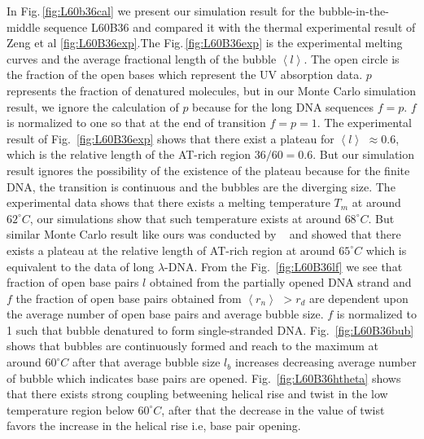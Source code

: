 \documentclass[12pt,masters,final]{UTRGVthesis}
\begin{document}
In Fig.\,\ref{fig:L60b36cal} we present our simulation result for the bubble-in-the-middle sequence L60B36 and compared it with the thermal experimental result of Zeng et al \cite{zeng2003length,zeng2004bubble}\ref{fig:L60B36exp}.The Fig.\,\ref{fig:L60B36exp} is the experimental melting curves and the average fractional length of the bubble $\left< l \right> $. The open circle is the fraction of the open bases which represent the UV absorption data. $p$ represents the fraction of denatured molecules, but in our Monte Carlo simulation result, we ignore the calculation of $p$ because for the long DNA sequences $f=p$. $f$ is normalized to one so that at the end of transition $f=p=1$. The experimental result of Fig.~\ref{fig:L60B36exp} shows that there exist a plateau for $\left< l \right> $ $\approx 0.6$, which is the relative length of the AT-rich region $36/60=0.6$. But our simulation result ignores the possibility of the existence of the plateau because for the finite DNA, the transition is continuous and the bubbles are the diverging size. The experimental data shows that there exists a melting temperature $T_{m}$ at around $62^\circ C$, our simulations show that such temperature exists at around $68^\circ C$. But similar Monte Carlo result like ours was conducted by ~\cite{ares2005bubble} and showed that there exists a plateau at the relative length of AT-rich region at around $65^\circ C$  which is equivalent to the data of long $\lambda$-DNA. From the Fig.~\ref{fig:L60B36lf} we see that fraction of open base pairs $l$ obtained from the partially opened DNA strand and $f$  the fraction of open base pairs obtained from $\left< r_{n} \right> $ $> r_{d}$ are dependent upon the average number of open base pairs and average bubble size. $f$ is normalized to 1 such that bubble denatured to form single-stranded DNA. Fig.~\ref{fig:L60B36bub} shows that bubbles are continuously formed and reach to the maximum at around $60^\circ C$ after that average bubble size $l_b$ increases decreasing average number of bubble which indicates base pairs are opened. Fig.~\ref{fig:L60B36htheta} shows that there exists strong coupling betweening helical rise and twist in the low temperature region below $60^\circ C$, after that the decrease in the value of twist favors the increase in the helical rise i.e, base pair opening.
%
\newpage
\end{document}
